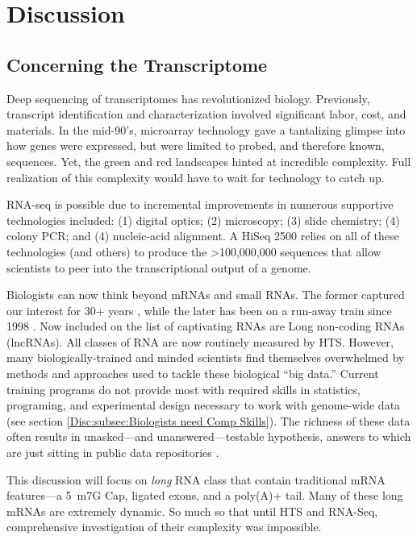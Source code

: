 \chapter{Discussion} 
\label{Disc}
\section{Concerning the Transcriptome}
  \label{Disc:sec:Future of Dynamic long RNAs}

  Deep sequencing of transcriptomes has revolutionized biology. Previously, transcript identification and characterization involved significant labor, cost, and materials. In the mid-90's, microarray technology \citep{Schena1995a} gave a tantalizing glimpse into how genes were expressed, but were limited to probed, and therefore known, sequences. Yet, the green and red landscapes hinted at incredible complexity. Full realization of this complexity would have to wait for technology to catch up.

  RNA-seq is possible due to incremental improvements in numerous supportive technologies included: (1) digital optics; (2) microscopy; (3) slide chemistry; (4) colony PCR; and (4) nucleic-acid alignment. A HiSeq 2500 relies on all of these technologies (and others) to produce the >100,000,000 sequences that allow scientists to peer into the transcriptional output of a genome.

  Biologists can now think beyond mRNAs and small RNAs. The former captured our interest for 30+ years \citep{Furuichi1975,Wei1975}, while the later has been on a run-away train since 1998 \citep{Fire1998}. Now included on the list of captivating RNAs are Long non-coding RNAs (lncRNAs). All classes of RNA are now routinely measured by HTS. However, many biologically-trained and minded scientists find themselves overwhelmed by methods and approaches used to tackle these biological ``big data.'' Current training programs do not provide most with required skills in statistics, programing, and experimental design necessary to work with genome-wide data (see section \ref{Disc:subsec:Biologists need Comp Skills}). The richness of these data often results in unasked---and unanswered---testable hypothesis, answers to which are just sitting in public data repositories \citep{Plocik2013}.

  This discussion will focus on \textit{long} RNA class that contain traditional mRNA features---a 5\textprime~m7G Cap, ligated exons, and a poly(A)+ tail. Many of these long mRNAs are extremely dynamic. So much so that until HTS and RNA-Seq, comprehensive investigation of their complexity was impossible.

